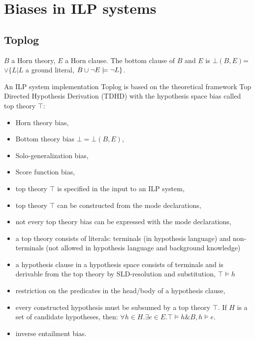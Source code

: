 \section{Biases in ILP systems}

\iffalse
\subsection{Progol}
\begin{itemize}
\item Inverse Entailment,
\item a bias provided by mode declaration,
\end{itemize}
\fi

\subsection{Toplog\cite{muggleton2008}}
\begin{defn}
$B$ a Horn theory, $E$ a Horn clause. The bottom clause of $B$ and $E$ is $\bot(B,E)$=$\vee\{L | L $ a ground literal, $B \cup {\neg E} \models \neg L\}$.
\end{defn}
An ILP system implementation Toplog is based on the theoretical framework Top Directed Hypothesis Derivation (TDHD) with the hypothesis space bias called top theory $\top$:
\begin{itemize}
\item Horn theory bias,
\item Bottom theory bias $\bot = \bot(B,E)$,
\item Solo-generalization bias,
\item Score function bias,
\item top theory $\top$ is specified in the input to an ILP system,
\item top theory $\top$ can be constructed from the mode declarations,
\item not every top theory bias can be expressed with the mode declarations,
\item a top theory consists of literals: terminals (in hypothesis language) and non-terminals (not allowed in hypothesis language and background knowledge)
\item a hypothesis clause in a hypothesis space consists of terminals and is derivable from the top theory by SLD-resolution and substitution, $\top \models h$
\item restriction on the predicates in the head/body of a hypothesis clause,
\item every constructed hypothesis must be subsumed by a top theory $\top$. If $H$ is a set of candidate hypotheses, then: $\forall h \in H. \exists e \in E. \top \models h \& B, h \models e$.
\item inverse entailment bias.
\end{itemize}
